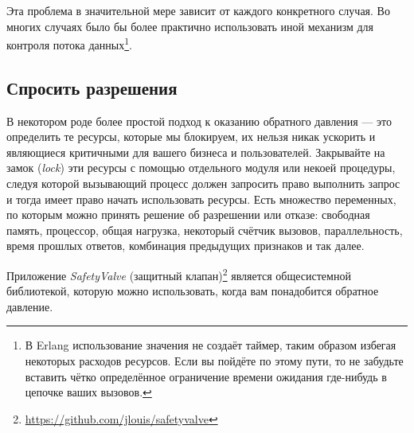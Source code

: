 \documentclass[11pt, oneside]{book}   	%
\begin{document}
Эта проблема в значительной мере зависит от каждого конкретного случая. Во многих случаях было бы более практично использовать иной механизм для контроля потока данных\footnote{В Erlang использование значения  не создаёт таймер, таким образом избегая некоторых расходов ресурсов. Если вы пойдёте по этому пути, то не забудьте вставить чётко определённое ограничение времени ожидания где-нибудь в цепочке ваших вызовов.}.


\subsection{Спросить разрешения}

В некотором роде более простой подход к оказанию обратного давления --- это определить те ресурсы, которые мы блокируем, их нельзя никак ускорить и являющиеся критичными для вашего бизнеса и пользователей. Закрывайте на замок (\emph{lock}) эти ресурсы с помощью отдельного модуля или некоей процедуры, следуя которой вызывающий процесс должен запросить право выполнить запрос и тогда имеет право начать использовать ресурсы. Есть множество переменных, по которым можно принять решение об разрешении или отказе: свободная память, процессор, общая нагрузка, некоторый счётчик вызовов, параллельность, время прошлых ответов, комбинация предыдущих признаков и так далее.

Приложение \emph{SafetyValve} (защитный клапан)\footnote{\href{https://github.com/jlouis/safetyvalve}{https://github.com/jlouis/safetyvalve}} является общесистемной библиотекой, которую можно использовать, когда вам понадобится обратное давление.
\end{document}
